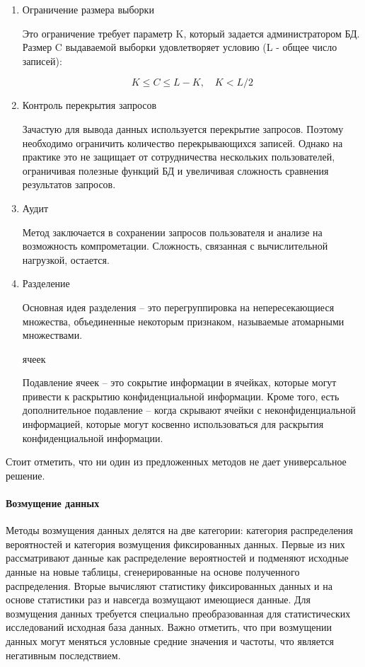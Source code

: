 \begin{enumerate}
  
  \item Ограничение размера выборки

Это ограничение требует параметр K, который задается администратором БД. Размер C выдаваемой выборки удовлетворяет условию (L - общее число записей):

\begin{displaymath}
K \leq C \leq L - K, \quad K < L/2
\end{displaymath}

  \item Контроль перекрытия запросов
  
Зачастую для вывода данных используется перекрытие запросов. Поэтому необходимо ограничить количество перекрывающихся записей. Однако на практике это не защищает от сотрудничества нескольких пользователей, ограничивая полезные функций БД и увеличивая сложность сравнения результатов запросов.

  \item Аудит
  
Метод заключается в сохранении запросов пользователя и анализе на возможность компрометации. Сложность, связанная с вычислительной нагрузкой, остается.

  \item Разделение
  
Основная идея разделения -- это перегруппировка на непересекающиеся множества, объединенные некоторым признаком, называемые атомарными множествами.

   ячеек
  
Подавление ячеек -- это сокрытие информации в ячейках, которые могут привести к раскрытию конфиденциальной информации. Кроме того, есть дополнительное подавление -- когда скрывают ячейки с неконфиденциальной информацией, которые могут косвенно использоваться для раскрытия конфиденциальной информации.

\end{enumerate}

Стоит отметить, что ни один из предложенных методов не дает универсальное решение.

\paragraph{Возмущение данных}

Методы возмущения данных делятся на две категории: категория распределения вероятностей и категория возмущения фиксированных данных. Первые из них рассматривают данные как распределение вероятностей и подменяют исходные данные на новые таблицы, сгенерированные на основе полученного распределения. Вторые вычисляют статистику фиксированных данных и на основе статистики раз и навсегда возмущают имеющиеся данные. Для возмущения данных требуется специально преобразованная для статистических исследований исходная база данных. Важно отметить, что при возмущении данных могут меняться условные средние значения и частоты, что является негативным последствием.


